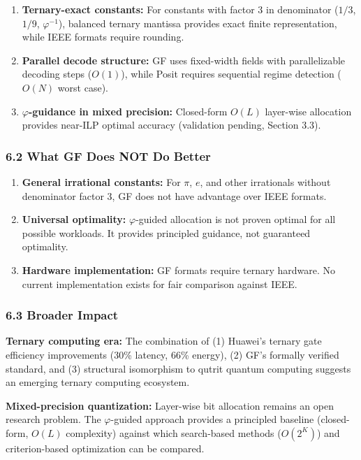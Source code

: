 \begin{enumerate}
\def\labelenumi{\arabic{enumi}.}
\item
  \textbf{Ternary-exact constants:} For constants with factor 3 in
  denominator (\(1/3\), \(1/9\), \(\varphi^{-1}\)), balanced ternary
  mantissa provides exact finite representation, while IEEE formats
  require rounding.
\item
  \textbf{Parallel decode structure:} GF uses fixed-width fields with
  parallelizable decoding steps (\(O(1)\)), while Posit requires
  sequential regime detection (\(O(N)\) worst case).
\item
  \textbf{\(\varphi\)-guidance in mixed precision:} Closed-form \(O(L)\)
  layer-wise allocation provides near-ILP optimal accuracy (validation
  pending, Section 3.3).
\end{enumerate}

\subsubsection{6.2 What GF Does NOT Do
Better}\label{what-gf-does-not-do-better}

\begin{enumerate}
\def\labelenumi{\arabic{enumi}.}
\item
  \textbf{General irrational constants:} For \(\pi\), \(e\), and other
  irrationals without denominator factor 3, GF does not have advantage
  over IEEE formats.
\item
  \textbf{Universal optimality:} \(\varphi\)-guided allocation is not
  proven optimal for all possible workloads. It provides principled
  guidance, not guaranteed optimality.
\item
  \textbf{Hardware implementation:} GF formats require ternary hardware.
  No current implementation exists for fair comparison against IEEE.
\end{enumerate}

\subsubsection{6.3 Broader Impact}\label{broader-impact}

\textbf{Ternary computing era:} The combination of (1) Huawei's ternary
gate efficiency improvements (30\% latency, 66\% energy), (2) GF's
formally verified standard, and (3) structural isomorphism to qutrit
quantum computing suggests an emerging ternary computing ecosystem.

\textbf{Mixed-precision quantization:} Layer-wise bit allocation remains
an open research problem. The \(\varphi\)-guided approach provides a
principled baseline (closed-form, \(O(L)\) complexity) against which
search-based methods (\(O(2^K)\)) and criterion-based optimization can
be compared.

